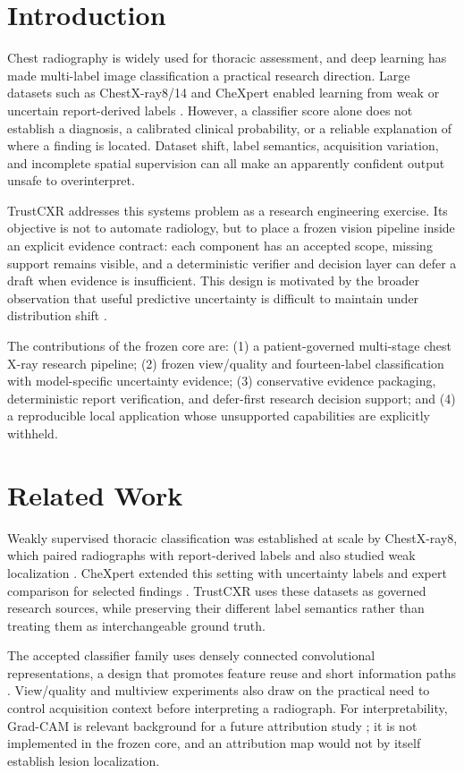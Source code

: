 \documentclass[10pt,a4paper,twocolumn]{article}
\begin{document}
\section{Introduction}
Chest radiography is widely used for thoracic assessment, and deep learning has made multi-label image classification a practical research direction. Large datasets such as ChestX-ray8/14 and CheXpert enabled learning from weak or uncertain report-derived labels \citep{wang2017chestxray8,irvin2019chexpert}. However, a classifier score alone does not establish a diagnosis, a calibrated clinical probability, or a reliable explanation of where a finding is located. Dataset shift, label semantics, acquisition variation, and incomplete spatial supervision can all make an apparently confident output unsafe to overinterpret.

TrustCXR addresses this systems problem as a research engineering exercise. Its objective is not to automate radiology, but to place a frozen vision pipeline inside an explicit evidence contract: each component has an accepted scope, missing support remains visible, and a deterministic verifier and decision layer can defer a draft when evidence is insufficient. This design is motivated by the broader observation that useful predictive uncertainty is difficult to maintain under distribution shift \citep{ovadia2019uncertainty}.

The contributions of the frozen core are: (1) a patient-governed multi-stage chest X-ray research pipeline; (2) frozen view/quality and fourteen-label classification with model-specific uncertainty evidence; (3) conservative evidence packaging, deterministic report verification, and defer-first research decision support; and (4) a reproducible local application whose unsupported capabilities are explicitly withheld.

\section{Related Work}
Weakly supervised thoracic classification was established at scale by ChestX-ray8, which paired radiographs with report-derived labels and also studied weak localization \citep{wang2017chestxray8}. CheXpert extended this setting with uncertainty labels and expert comparison for selected findings \citep{irvin2019chexpert}. TrustCXR uses these datasets as governed research sources, while preserving their different label semantics rather than treating them as interchangeable ground truth.

The accepted classifier family uses densely connected convolutional representations, a design that promotes feature reuse and short information paths \citep{huang2017densenet}. View/quality and multiview experiments also draw on the practical need to control acquisition context before interpreting a radiograph. For interpretability, Grad-CAM is relevant background for a future attribution study \citep{selvaraju2017gradcam}; it is not implemented in the frozen core, and an attribution map would not by itself establish lesion localization.
\end{document}
